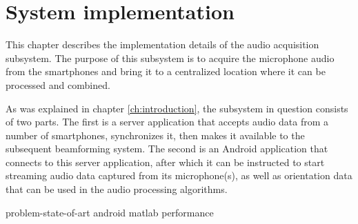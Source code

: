 \documentclass[a4paper, notitlepage]{report}
\begin{document}
\chapter{System implementation}
\label{ch:system}
This chapter describes the implementation details of the audio acquisition subsystem. The purpose of this subsystem is to acquire the microphone audio from the smartphones and bring it to a centralized location where it can be processed and combined.

As was explained in chapter \ref{ch:introduction}, the subsystem in question consists of two parts.
The first is a server application that accepts audio data from a number of smartphones, synchronizes it, then makes it available to the subsequent beamforming system.
The second is an Android application that connects to this server application, after which it can be instructed to start streaming audio data captured from its microphone(s), as well as orientation data that can be used in the audio processing algorithms.

{problem-state-of-art} %
{android}		%
{matlab}		%
{performance}	%
\end{document}
